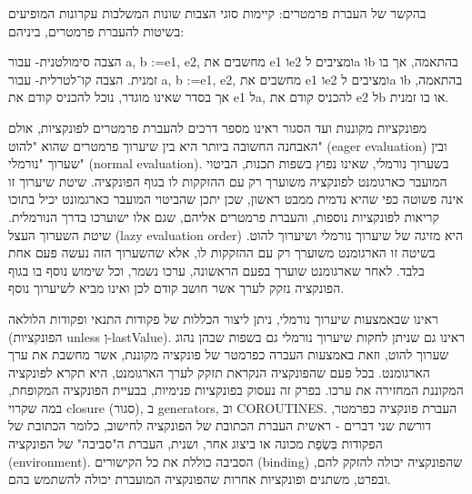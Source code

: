 \begin{טבלא}[!htbp]
        בהקשר של העברת פרמטרים:
        קיימות סוגי הצבות שונות המשלבות עקרונות המופיעים בשיטות להעברת פרמטרים, ביניהם:

        הצבה סימולטנית- עבור a, b :=e1, e2, מחשבים את e1 וe2 ומציבים לa וb בהתאמה, אך בו זמנית.
        הצבה קו־לטרלית- עבור a, b :=e1, e2, מחשבים את e1 וe2 ומציבים לa וb בהתאמה, אך בסדר שאינו מוגדר, נוכל להכניס קודם את e1 לa, להכניס קודם את e2 לb או בו זמנית.

        מפונקציות מקוננות ועד הסגור
        ראינו מספר דרכים להעברת פרמטרים לפונקציות, אולם האבחנה החשובה ביותר היא בין
        שיערוך פרמטרים שהוא "להוט" (eager evaluation) ובין שערוך "נורמלי" (normal
        evaluation). בשערוך נורמלי, שאינו נפוץ בשפות תכנות, הביטוי המועבר כארגומנט
        לפונקציה משוערך רק עם ההזקקות לו בגוף הפונקציה. שיטת שיערוך זו אינה פשוטה כפי
        שהיא נדמית ממבט ראשון, שכן יתכן שהביטוי המועבר כארגמונט יכיל בתוכו קריאות
        לפונקציות נוספות, והעברת פרמטרים אליהם, שגם אלו ישוערכו בדרך הנורמלית. שיטת
        השערוך העצל (lazy evaluation order) היא מזיגה של שיערוך נורמלי ושיערוך להוט.
        בשיטה זו הארגומנט משוערך רק עם ההזקקות לו, אלא שהשערוך הזה נעשה פעם אחת בלבד.
        לאחר שארגומנט שוערך בפעם הראשונה, ערכו נשמר, וכל שימוש נוסף בו בגוף הפונקציה
        נזקק לערך אשר חושב קודם לכן ואינו מביא לשיערוך נוסף.

        ראינו שבאמצעות שיערוך נורמלי, ניתן ליצור הכללות של פקודות התנאי ופקודות הלולאה
        (הפונקציות unless וְ-lastValue). ראינו גם שניתן לחקות שיערוך נורמלי גם בשפות
        שבהן נהוג שערוך להוט, וזאת באמצעות העברה כפרמטר של פונקציה מקוננת, אשר מחשבת את
        ערך הארגומנט. בכל פעם שהפונקציה הנקראת תזקק לערך הארגומנט, היא תקרא לפונקציה
        המקוננת המחזירה את ערכו. בפרק זה נעסוק בפונקציות פנימיות, בבעיית הפונקציה
        המקופחת, במה שקרוי closure (סגור), ב generators, וב COROUTINES.
        העברת פונקציה כפרמטר, דורשת שני דברים - ראשית העברת הכתובת של הפונקציה לחישוב, כלומר הכתובת של הפקודות בִּשְׂפַת מכונה או ביצוג אחר, ושנית, העברת ה"סביבה" של הפונקציה (environment). הסביבה כוללת את כל הקישורים (binding) שהפונקציה יכולה להזקק להם, ובפרט, משתנים ופונקציות אחרות שהפונקציה המועברת יכולה להשתמש בהם.


\end{טבלא}
